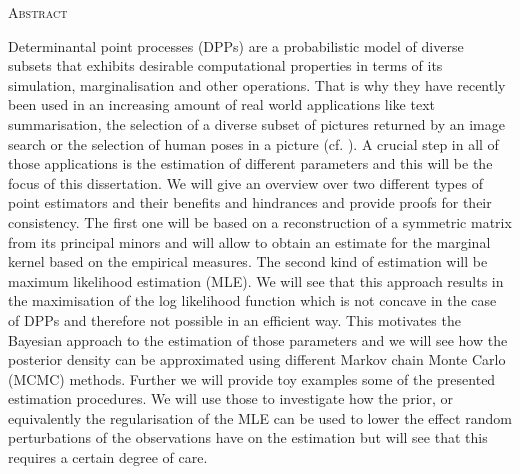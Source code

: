 \begin{center}
{\LARGE\textsc{Abstract}\\[.9cm]}
\begin{minipage}{11cm}
Determinantal point processes (DPPs) are a probabilistic model of diverse subsets that exhibits desirable computational properties in terms of its simulation, marginalisation and other operations. That is why they have recently been used in an increasing amount of real world applications like text summarisation, the selection of a diverse subset of pictures returned by an image search or the selection of human poses in a picture (cf. \cite{kulesza2012learning}). A crucial step in all of those applications is the estimation of different parameters and this will be the focus of this dissertation. We will give an overview over two different types of point estimators and their benefits and hindrances and provide proofs for their consistency. The first one will be based on a reconstruction of a symmetric matrix from its principal minors and will allow to obtain an estimate for the marginal kernel based on the empirical measures. The second kind of estimation will be maximum likelihood estimation (MLE). We will see that this approach results in the maximisation of the log likelihood function which is not concave in the case of DPPs and therefore not possible in an efficient way. This motivates the Bayesian approach to the estimation of those parameters and we will see how the posterior density can be approximated using different Markov chain Monte Carlo (MCMC) methods. Further we will provide toy examples some of the presented estimation procedures. We will use those to investigate how the prior, or equivalently the regularisation of the MLE can be used to lower the effect random perturbations of the observations have on the estimation but will see that this requires a certain degree of care.
\end{minipage}
\end{center}


\clearpage
